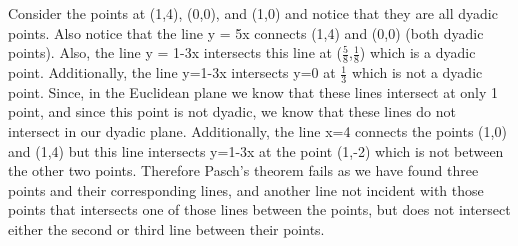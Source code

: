 \documentclass[12pt,letterpaper]{article}
\begin{document}
Consider the points at (1,4), (0,0), and (1,0) and notice that they are all dyadic points.  Also notice that the line y = 5x connects (1,4) and (0,0) (both dyadic points).  Also, the line y = 1-3x intersects this line at ($\frac{5}{8}$,$\frac{1}{8}$) which is a dyadic point.  Additionally, the line y=1-3x intersects y=0 at $\frac{1}{3}$ which is not a dyadic point.  Since, in the Euclidean plane we know that these lines intersect at only 1 point,  and since this point is not dyadic, we know that these lines do not intersect in our dyadic plane.  Additionally, the line x=4 connects the points (1,0) and (1,4) but this line intersects y=1-3x at the point (1,-2) which is not between the other two points.  Therefore Pasch's theorem fails as we have found three points and their corresponding lines, and another line not incident with those points that intersects one of those lines between the points, but does not intersect either the second or third line between their points.  \\
\end{document}
